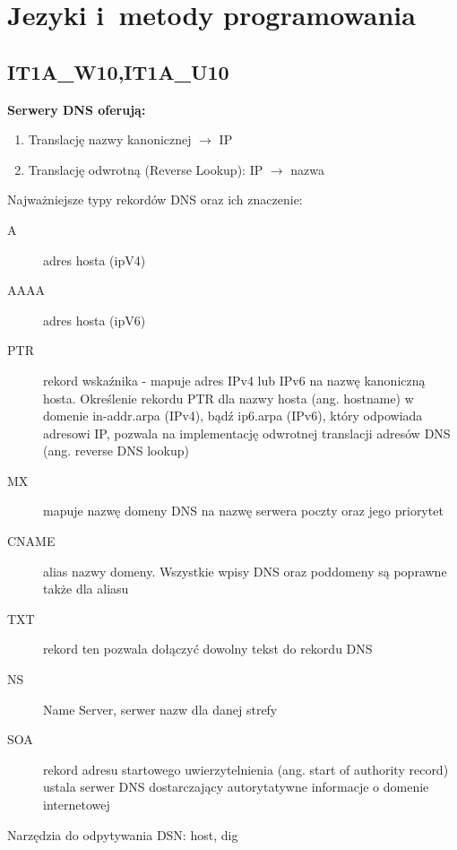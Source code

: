 \chapter{Jezyki i~metody programowania}
\PartialToc
\section{IT1A\_W10,IT1A\_U10}
\textbf{Serwery DNS oferują:}
\vspace{0.4cm}
\noindent
\begin{enumerate}
\item Translację nazwy kanonicznej $\rightarrow$ IP
\item Translację odwrotną (Reverse Lookup): IP $\rightarrow$ nazwa
\end{enumerate}
\vspace{0.4cm}
Najważniejsze typy rekordów DNS oraz ich znaczenie:
\begin{description}

\item[A] adres hosta (ipV4) 
\item[AAAA]  adres hosta (ipV6) 
\item[PTR]  	
	rekord wskaźnika - mapuje adres IPv4 lub IPv6 na nazwę kanoniczną hosta. 		Określenie rekordu PTR dla nazwy hosta (ang. hostname) w domenie in-addr.arpa 	(IPv4), bądź ip6.arpa (IPv6), który odpowiada adresowi IP, pozwala na 			implementację odwrotnej translacji adresów DNS (ang. reverse DNS lookup) 
\item[MX] mapuje nazwę domeny DNS na nazwę serwera poczty oraz jego priorytet 
\item[CNAME]	alias nazwy domeny. Wszystkie wpisy DNS oraz poddomeny są 	poprawne także dla aliasu 
\item[TXT]	rekord ten pozwala dołączyć dowolny tekst do rekordu DNS 
\item[NS] Name Server, serwer nazw dla danej strefy 
\item[SOA]    rekord adresu startowego uwierzytelnienia (ang. start of authority record) ustala serwer DNS dostarczający autorytatywne informacje o domenie internetowej 
\end{description}

Narzędzia do odpytywania DSN: host, dig


